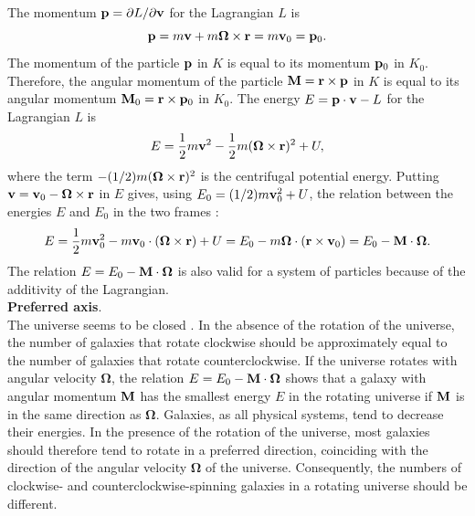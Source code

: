 \documentclass[prd,onecolumn,nofootinbib]{revtex4}
\begin{document}
The momentum ${\bf p}=\partial L/\partial{\bf v}$ for the Lagrangian $L$ is
\begin{equation}
{\bf p}=m{\bf v}+m{\bm\Omega}\times{\bf r}=m{\bf v}_0={\bf p}_0.
\end{equation}
The momentum of the particle ${\bf p}$ in $K$ is equal to its momentum ${\bf p}_0$ in $K_0$.
Therefore, the angular momentum of the particle ${\bf M}={\bf r}\times{\bf p}$ in $K$ is equal to its angular momentum ${\bf M}_0={\bf r}\times{\bf p}_0$ in $K_0$.
The energy $E={\bf p}\cdot{\bf v}-L$ for the Lagrangian $L$ is
\begin{equation}
E=\frac{1}{2}m{\bf v}^2-\frac{1}{2}m({\bm\Omega}\times{\bf r})^2+U,
\end{equation}
where the term $-(1/2)m({\bm\Omega}\times{\bf r})^2$ is the centrifugal potential energy.
Putting ${\bf v}={\bf v}_0-{\bm\Omega}\times{\bf r}$ in $E$ gives, using $E_0=(1/2)m{\bf v}^2_0+U$, the relation between the energies $E$ and $E_0$ in the two frames \cite{LL1}:
\begin{equation}
E=\frac{1}{2}m{\bf v}^2_0-m{\bf v}_0\cdot({\bm\Omega}\times{\bf r})+U=E_0-m{\bm\Omega}\cdot({\bf r}\times{\bf v}_0)=E_0-{\bf M}\cdot{\bm\Omega}.
\end{equation}
The relation $E=E_0-{\bf M}\cdot{\bm\Omega}$ is also valid for a system of particles because of the additivity of the Lagrangian.\\


\noindent
{\bf Preferred axis}.\\
The universe seems to be closed \cite{closed}.
In the absence of the rotation of the universe, the number of galaxies that rotate clockwise should be approximately equal to the number of galaxies that rotate counterclockwise.
If the universe rotates with angular velocity ${\bm\Omega}$, the relation $E=E_0-{\bf M}\cdot{\bm\Omega}$ shows that a galaxy with angular momentum ${\bf M}$ has the smallest energy $E$ in the rotating universe if ${\bf M}$ is in the same direction as ${\bm\Omega}$.
Galaxies, as all physical systems, tend to decrease their energies.
In the presence of the rotation of the universe, most galaxies should therefore tend to rotate in a preferred direction, coinciding with the direction of the angular velocity ${\bm\Omega}$ of the universe.
Consequently, the numbers of clockwise- and counterclockwise-spinning galaxies in a rotating universe should be different.
\end{document}
